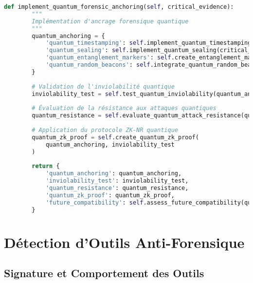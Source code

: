 \begin{lstlisting}[language=Python, caption=Système de défense adaptative contre l'anti-forensique]
    def implement_quantum_forensic_anchoring(self, critical_evidence):
        """
        Implémentation d'ancrage forensique quantique
        """
        quantum_anchoring = {
            'quantum_timestamping': self.implement_quantum_timestamping(critical_evidence),
            'quantum_sealing': self.implement_quantum_sealing(critical_evidence),
            'quantum_entanglement_markers': self.create_entanglement_markers(critical_evidence),
            'quantum_random_beacons': self.integrate_quantum_random_beacons(critical_evidence)
        }
        
        # Validation de l'inviolabilité quantique
        inviolability_test = self.test_quantum_inviolability(quantum_anchoring)
        
        # Évaluation de la résistance aux attaques quantiques
        quantum_resistance = self.evaluate_quantum_attack_resistance(quantum_anchoring)
        
        # Application du protocole ZK-NR quantique
        quantum_zk_proof = self.create_quantum_zk_proof(
            quantum_anchoring, inviolability_test
        )
        
        return {
            'quantum_anchoring': quantum_anchoring,
            'inviolability_test': inviolability_test,
            'quantum_resistance': quantum_resistance,
            'quantum_zk_proof': quantum_zk_proof,
            'future_compatibility': self.assess_future_compatibility(quantum_anchoring)
        }
\end{lstlisting}

\section{Détection d'Outils Anti-Forensique}

\subsection{Signature et Comportement des Outils}

